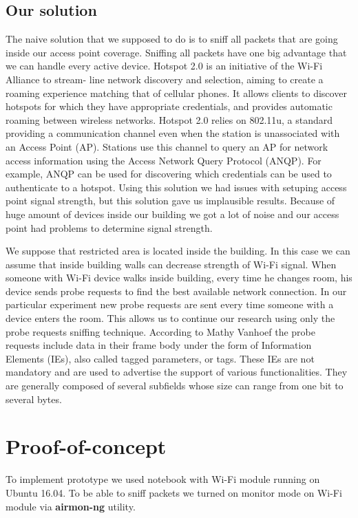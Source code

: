 \documentclass[a4paper,11pt]{article}
\begin{document}
\subsection{Our solution}
The naive solution that we supposed to do is to sniff all packets that are going inside our access point coverage. Sniffing all packets have one big advantage that we can handle every active device. Hotspot 2.0 is an initiative of the Wi-Fi Alliance to stream- line network discovery and selection, aiming to create a roaming experience matching that of cellular phones. It allows clients to discover hotspots for which they have appropriate credentials, and provides automatic roaming between wireless networks. Hotspot 2.0 relies on 802.11u, a standard providing a communication channel even when the station is unassociated with an Access Point (AP). Stations use this channel to query an AP for network access information using the Access Network Query Protocol (ANQP). For example, ANQP can be used for discovering which credentials can be used to authenticate to a hotspot. Using this solution we had issues with setuping access point signal strength, but this solution gave us implausible results. Because of huge amount of devices inside our building we got a lot of noise and our access point had problems to determine signal strength.

We suppose that restricted area is located inside the building. In this case we can assume that inside building walls can decrease strength of Wi-Fi signal. When someone with Wi-Fi device walks inside building, every time he changes room, his device sends probe requests to find the best available network connection. In our particular experiment new probe requests are sent every time someone with a device enters the room. This allows us to continue our research using only the probe requests sniffing technique. According to Mathy Vanhoef the probe requests include data in their frame body under the form of Information Elements (IEs), also called tagged parameters, or tags. These IEs are not mandatory and are used to advertise the support of various functionalities. They are generally composed of several subfields whose size can range from one bit to several bytes. 

\section{Proof-of-concept}
To implement prototype we used notebook with Wi-Fi module running on Ubuntu 16.04. To be able to sniff packets we turned on monitor mode on Wi-Fi module via \textbf{airmon-ng} utility.
\end{document}
